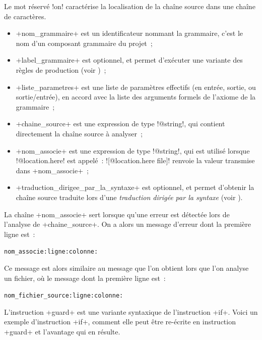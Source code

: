 Le mot réservé \ggsq!on! caractérise la localisation de la chaîne source dans une chaîne de caractères.
\begin{itemize}
  \item \ggsq+nom_grammaire+ est un identificateur nommant la grammaire, c'est le nom d'un composant grammaire du projet~;
  \item \ggsq+label_grammaire+ est optionnel, et permet d'exécuter une variante des règles de production (voir )~;
  \item \ggsq+liste_parametres+ est une liste de paramètres effectifs (en entrée, sortie, ou sortie/entrée), en accord avec la liste des arguments formels de l'axiome de la grammaire~;
  \item \ggsq+chaine_source+ est une expression de type \ggsq!@string!, qui contient directement la chaîne source à analyser~;
  \item \ggsq+nom_associe+ est une expression de type \ggsq!@string!, qui est utilisé lorsque \ggsq!@location.here! est appelé~: \ggsq![@location.here file]! renvoie la valeur transmise dans \ggsq+nom_associe+~;
  \item \ggsq+traduction_dirigee_par_la_syntaxe+ est optionnel, et permet d'obtenir la chaîne source traduite lors d'une \emph{traduction dirigée par la syntaxe} (voir ).
\end{itemize}



La chaîne \ggsq+nom_associe+ sert lorsque qu'une erreur est détectée lors de l'analyse de \ggsq+chaine_source+. On a alors un message d'erreur dont la première ligne est~:

\texttt{nom\_associe:ligne:colonne:}

Ce message est alors similaire au message que l'on obtient lors que l'on analyse un fichier, où le message dont la première ligne est~:

\texttt{nom\_fichier\_source:ligne:colonne:}















L'instruction \ggsq+guard+ est une variante syntaxique de l'instruction \ggsq+if+. Voici un exemple d'instruction \ggsq+if+, comment elle peut être re-écrite en instruction \ggsq+guard+ et l'avantage qui en résulte.

